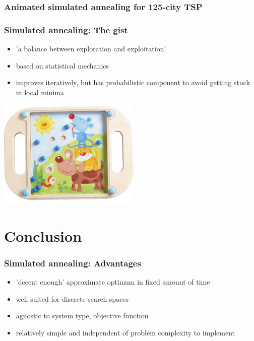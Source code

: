 \documentclass[aspectratio=43]{beamer}
\begin{document}
\begin{frame}
	\frametitle{Animated simulated annealing for 125-city TSP}
	\begin{center}
		\cite{Geodac}
	\end{center}
\end{frame}

\begin{frame}
	\frametitle{Simulated annealing: The gist}
	\begin{center}
		\begin{itemize}
			\item<1-> \alert{'a balance between exploration and exploitation'}
			\item<1-> based on statistical mechanics
			\item<1-> improves iteratively, but has probabilistic component to avoid getting stuck in local minima
		\end{itemize}
	\end{center}
\end{frame}

\begin{frame}
	\begin{center}
		\includegraphics[width=6.8cm]{toy.png}
	\end{center}
\end{frame}

\section{Conclusion}

\begin{frame}
	\frametitle{Simulated annealing: Advantages}
	\begin{center}
		\begin{itemize}
			\item<1-> \alert{'decent enough'} approximate optimum in fixed amount of time
			\item<1-> well suited for discrete search spaces
			\item<1-> agnostic to system type, objective function
			\item<1-> relatively simple and independent of problem complexity to implement
		\end{itemize}
	\end{center}
\end{frame}
\end{document}
